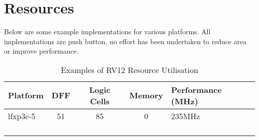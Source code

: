 \chapter{Resources}\label{resources}

Below are some example implementations for various platforms. All implementations are push button, no effort has been undertaken to reduce area or improve performance.

\begin{longtable}[]{@{}lcccl@{}}
	\toprule
	Platform & DFF & Logic Cells & Memory & Performance (MHz)\tabularnewline
	\midrule
	\endhead
	lfxp3c-5 & 51 & 85 & 0 & 235MHz\tabularnewline
	& & & &\tabularnewline
	& & & &\tabularnewline
	& & & &\tabularnewline
	\bottomrule
	\caption{Examples of RV12 Resource Utilisation}
	\label{tab:resource-utilistion}
\end{longtable}
